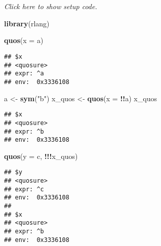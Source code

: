 \documentclass[]{book}
\newenvironment{Shaded}{\begin{snugshade}}{\end{snugshade}}
\newcommand{\DataTypeTok}[1]{\textcolor[rgb]{0.13,0.29,0.53}{#1}}
\newcommand{\KeywordTok}[1]{\textcolor[rgb]{0.13,0.29,0.53}{\textbf{#1}}}
\newcommand{\NormalTok}[1]{#1}
\newcommand{\OperatorTok}[1]{\textcolor[rgb]{0.81,0.36,0.00}{\textbf{#1}}}
\newcommand{\StringTok}[1]{\textcolor[rgb]{0.31,0.60,0.02}{#1}}
\begin{document}
\hypertarget{section}{%
\section{}\label{section}}

\emph{Click here to show setup code.}

\begin{Shaded}
\begin{Highlighting}[]
\KeywordTok{library}\NormalTok{(rlang)}
\end{Highlighting}
\end{Shaded}

\begin{Shaded}
\begin{Highlighting}[]
\KeywordTok{quos}\NormalTok{(}\DataTypeTok{x =}\NormalTok{ a)}
\end{Highlighting}
\end{Shaded}

\begin{verbatim}
## $x
## <quosure>
## expr: ^a
## env:  0x3336108
\end{verbatim}

\begin{Shaded}
\begin{Highlighting}[]
\NormalTok{a <-}\StringTok{ }\KeywordTok{sym}\NormalTok{(}\StringTok{"b"}\NormalTok{)}
\NormalTok{x_quos <-}\StringTok{ }\KeywordTok{quos}\NormalTok{(}\DataTypeTok{x =} \OperatorTok{!!}\NormalTok{a)}
\NormalTok{x_quos}
\end{Highlighting}
\end{Shaded}

\begin{verbatim}
## $x
## <quosure>
## expr: ^b
## env:  0x3336108
\end{verbatim}

\begin{Shaded}
\begin{Highlighting}[]
\KeywordTok{quos}\NormalTok{(}\DataTypeTok{y =}\NormalTok{ c, }\OperatorTok{!!!}\NormalTok{x_quos)}
\end{Highlighting}
\end{Shaded}

\begin{verbatim}
## $y
## <quosure>
## expr: ^c
## env:  0x3336108
## 
## $x
## <quosure>
## expr: ^b
## env:  0x3336108
\end{verbatim}

\hypertarget{section-1}{%
\section{}\label{section-1}}
\end{document}
